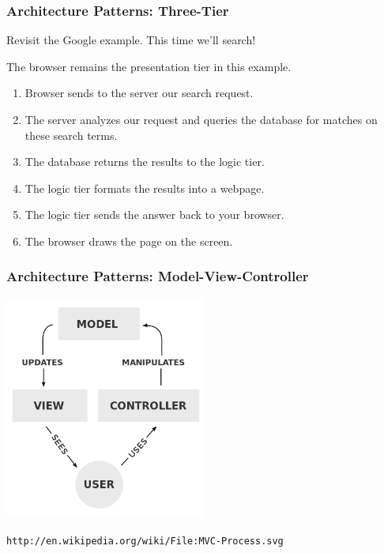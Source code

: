 \begin{frame}
\frametitle{Architecture Patterns: Three-Tier}

\begin{changemargin}{1cm}
Revisit the Google example. This time we'll search!

The browser remains the presentation tier in this example.

\begin{enumerate}
\item Browser sends to the server our search request. 

\item The server analyzes our request and queries the database for matches on these search terms. 

\item The database returns the results to the logic tier.

\item The logic tier formats the results into a webpage. 

\item The logic tier sends the answer back to your browser. 

\item The browser draws the page on the screen.
\end{enumerate}

\end{changemargin}
\end{frame}



\begin{frame}
\frametitle{Architecture Patterns: Model-View-Controller}
\begin{center}

	\includegraphics[width=0.5\textwidth]{images/mvc.png}
	
	\texttt{\small http://en.wikipedia.org/wiki/File:MVC-Process.svg}
\end{center}
\end{frame}

